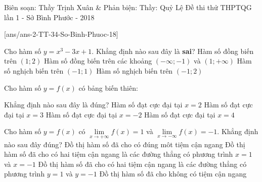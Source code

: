 \begin{name}
{Biên soạn: Thầy Trịnh Xuân \& Phản biện: Thầy: Quỷ Lệ }
{Đề thi thử THPTQG lần 1 - Sở Bình Phước - 2018}
\end{name}
\setcounter{ex}{0}\setcounter{bt}{0}
[ans/ans-2-TT-34-So-Binh-Phuoc-18]

\begin{ex}%
	Cho hàm số $y=x^3-3x+1$. Khẳng định nào sau đây là \textbf{sai}?
	\choice
	{Hàm số đồng biến trên $(1;2)$}
	{Hàm số đồng biến trên các khoảng $(-\infty;-1)$ và $(1;+\infty)$}
	{Hàm số nghịch biến trên $(-1;1)$}
	{\True Hàm số nghịch biến trên $(-1;2)$}
\end{ex}

\begin{ex}%
	Cho hàm số $y=f(x)$ có bảng biến thiên:
	\begin{center}
	\end{center}
Khẳng định nào sau đây là đúng?
	\choice
	{\True Hàm số đạt cực đại tại $x=2$}
	{Hàm số đạt cực đại tại $x=3$}
	{Hàm số đạt cực đại tại $x=-2$}
	{Hàm số đạt cực đại tại $x=4$}
\end{ex}

\begin{ex}%
	Cho hàm số $y=f(x)$ có $\lim\limits_{x\to +\infty}f(x)=1$ và $\lim\limits_{x\to -\infty}f(x)=-1$. Khẳng định nào sau đây đúng?
	\choice
	{Đồ thị hàm số đã cho có đúng môt tiệm cận ngang}
	{Đồ thị hàm số đã cho có hai tiệm cận ngang là các đường thẳng có phương trình $x=1$ và $x=-1$}
	{\True Đồ thị hàm số đã cho có hai tiệm cận ngang là các đường thẳng có phương trình $y=1$ và $y=-1$}
	{Đồ thị hàm số đã cho không có tiệm cận ngang}
\end{ex}

